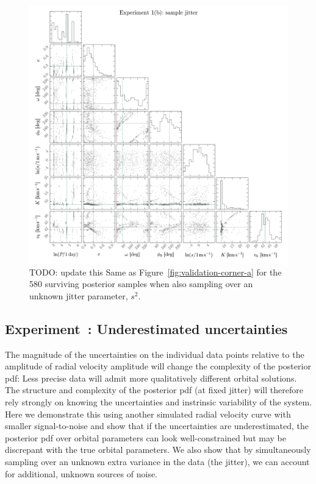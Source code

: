 \documentclass[manuscript, letterpaper]{aastex6}
\newcommand{\figname}{Figure}
\newcounter{expcounter}
\newcommand{\todo}[1]{{\color{red}TODO: #1}}
\begin{document}
\begin{figure}[p]
\begin{center}
\includegraphics[width=\textwidth]{figures/validation-corner-b.pdf}
\end{center}
\caption{%
\todo{update this}
Same as \figname~\ref{fig:validation-corner-a} for the 580 surviving posterior
samples when also sampling over an unknown jitter parameter, $s^2$.
\label{fig:validation-corner-b}}
\end{figure}

\subsection{Experiment~: Underestimated uncertainties}
\label{sec:undunc}

The magnitude of the uncertainties on the individual data points relative to the
amplitude of radial velocity amplitude will change the complexity of the
posterior pdf: Less precise data will admit more qualitatively different
orbital solutions.
The structure and complexity of the posterior pdf (at fixed jitter) will
therefore rely strongly on knowing the uncertainties and instrinsic variability
of the system.
Here we demonstrate this using another simulated radial velocity curve with
smaller signal-to-noise and show that if the uncertainties are underestimated,
the posterior pdf over orbital parameters can look well-constrained but may be
discrepant with the true orbital parameters.
We also show that by simultaneously sampling over an unknown extra variance in
the data (the jitter), we can account for additional, unknown sources of noise.
\end{document}
